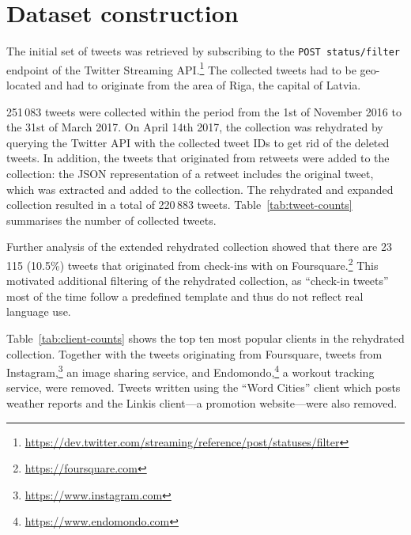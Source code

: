 \documentclass[11pt,a4paper]{article}
\begin{document}

\section{Dataset construction}
\label{sec:construction}

The initial set of tweets was retrieved by subscribing to the \texttt{POST status/filter} endpoint of the Twitter Streaming API.\footnote{\url{https://dev.twitter.com/streaming/reference/post/statuses/filter}}
The collected tweets had to be geo-located and had to originate from the area of Riga, the capital of Latvia.\footnotemark{}


251\,083 tweets were collected within the period from the 1st of November 2016 to the 31st of March 2017. On April 14th 2017, the collection was rehydrated by querying the Twitter API with the collected tweet IDs to get rid of the deleted tweets. In addition, the tweets that originated from retweets were added to the collection: the JSON representation of a retweet includes the original tweet, which was extracted and added to the collection. The rehydrated and expanded collection resulted in a total of 220\,883 tweets. Table~\ref{tab:tweet-counts} summarises the number of collected tweets.



Further analysis of the extended rehydrated collection showed that there are 23\,115 (10.5\%) tweets that originated from check-ins with on Foursquare.\footnote{\url{https://foursquare.com}} This motivated additional filtering of the rehydrated collection, as ``check-in tweets'' most of the time follow a predefined template and thus do not reflect real language use. %



Table~\ref{tab:client-counts} shows the top ten most popular clients in the rehydrated collection. Together with the tweets originating from Foursquare, tweets from Instagram,\footnote{\url{https://www.instagram.com}} an image sharing service, and Endomondo,\footnote{\url{https://www.endomondo.com}} a workout tracking service, were removed. Tweets written using the ``Word Cities'' client which posts weather reports and the Linkis client---a promotion website---were also removed.
\end{document}
